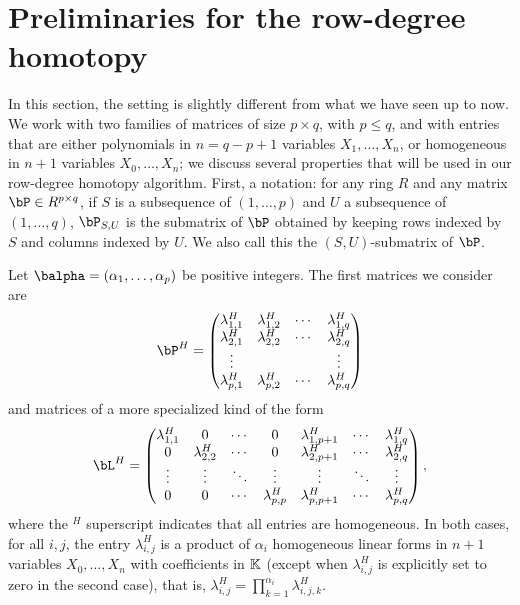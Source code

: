 \documentclass[12pt]{article}
\begin{document}
\section{Preliminaries for the row-degree homotopy}\label{sec:prel-row}

In this section, the setting is slightly different from what we have
seen up to now.  We work with two families of matrices of size $p
\times q$, with $p \le q$, and with entries that are either
polynomials in $n=q-p+1$ variables $X_1,\dots,X_n$, or homogeneous in
$n+1$ variables $X_0,\dots,X_n$; we discuss several properties that
will be used in our row-degree homotopy algorithm. First, a notation:
for any ring $R$ and any matrix $\bP \in R^{p\times q}$, if $S$ is a
subsequence of $(1,\dots,p)$ and $U$ a subsequence of $(1,\dots,q)$,
$\bP_{S,U}$ is the submatrix of $\bP$ obtained by keeping rows indexed
by $S$ and columns indexed by $U$. We also call this the
$(S,U)$-submatrix of $\bP$.

Let $\balpha=(\alpha_1,\dots,\alpha_p)$ be positive integers. The
first matrices we consider are
\begin{align}\label{eqdef:type2}
\bP^H= \left( \begin{matrix}
\lambda^H_{1,1} & \lambda^H_{1,2} & \cdots & \lambda^H_{1, q}\\
 \lambda^H_{2,1} &  \lambda^H_{2,2} & \cdots & \lambda^H_{2, q}\\
 \vdots & & & \vdots\\
 \lambda^H_{p,1} &  \lambda^H_{p,2}& \cdots & \lambda^H_{p, q}
\end{matrix} \right)
\end{align}
and matrices of a more specialized kind of the form
\begin{align}\label{eqdef:type1}
\bL^H= \left( \begin{matrix}
\lambda^H_{1,1} & 0 & \cdots & 0 & \lambda^H_{1,p+1} & \cdots & \lambda^H_{1, q}\\
0 & \lambda^H_{2,2} & \cdots & 0 & \lambda^H_{2,p+1} & \cdots & \lambda^H_{2, q}\\
\vdots & \vdots & \ddots & \vdots & \vdots & \ddots & \vdots\\
0 & 0 & \cdots & \lambda^H_{p,p} & \lambda^H_{p,p+1} & \cdots & \lambda^H_{p, q}
\end{matrix} \right),
\end{align}
where the ${}^H$ superscript indicates that all entries are
homogeneous.  In both cases, for all $i,j$, the entry $\lambda^H_{i,j}$
is a product of $\alpha_i$ homogeneous linear forms in $n+1$ variables
$X_0,\dots,X_n$ with coefficients in $\mathbb{K}$ (except when
$\lambda^H_{i,j}$ is explicitly set to zero in the second case), that
is, $\lambda^H_{i,j}=\prod_{k=1}^{\alpha_i} \lambda^H_{i,j,k}$.  
\end{document}
